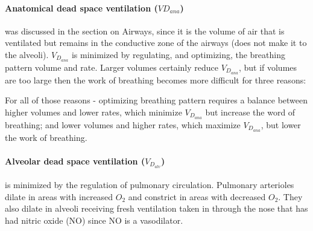 \paragraph{Anatomical dead space ventilation ($VD_{ana}$)} was discussed in the section on Airways, since it is the volume of air that is ventilated but remains in the conductive zone of the airways (does not make it to the alveoli). $V_D_{ana}$ is minimized by regulating, and optimizing, the breathing pattern volume and rate. Larger volumes certainly reduce $V_D_{ana}$, but if volumes are too large then the work of breathing becomes more difficult for three reasons:


For all of those reasons - optimizing breathing pattern requires a balance between higher volumes and lower rates, which minimize $V_D_{ana}$ but increase the word of breathing; and lower volumes and higher rates, which maximize $V_D_{ana}$, but lower the work of breathing.

\paragraph{Alveolar dead space ventilation ($V_D_{alv}$)} is minimized by the regulation of pulmonary circulation. Pulmonary arterioles dilate in areas with increased $O_2$ and constrict in areas with decreased $O_2$. They also dilate in alveoli receiving fresh ventilation taken in through the nose that has had nitric oxide (NO) since NO is a vasodilator.

